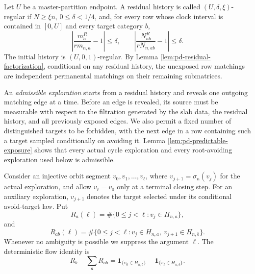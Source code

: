 \documentclass[11pt]{article}
\theoremstyle{remark}
\newcommand{\one}{\mathbf 1}
\begin{document}
Let $U$ be a master-partition endpoint.  A residual history is called
$(U,\delta,\xi)$-regular if $N\ge\xi n$, $0\le\delta<1/4$, and, for every row
whose clock interval is contained in $[0,U]$ and every target category $b$,
\begin{equation}
 \left|\frac{m_a^R}{r m_{n,a}}-1\right|\le\delta,
 \qquad
 \left|\frac{N_{ab}^R}{r N_{n,ab}}-1\right|\le\delta.
 \label{eq:pd-regular-history}
\end{equation}
The initial history is $(U,0,1)$-regular.  By Lemma
\ref{lem:pd-residual-factorization}, conditional on any residual history, the
unexposed row matchings are independent permanental matchings on their
remaining submatrices.

An \emph{admissible exploration} starts from a residual history and reveals one
outgoing matching edge at a time.  Before an edge is revealed, its source must
be measurable with respect to the filtration generated by the slab data, the
residual history, and all previously exposed edges.  We also permit a fixed
number of distinguished targets to be forbidden, with the next edge in a row
containing such a target sampled conditionally on avoiding it.  Lemma
\ref{lem:pd-predictable-exposure} shows that every actual cycle exploration and
every root-avoiding exploration used below is admissible.

Consider an injective orbit segment $v_0,v_1,\ldots,v_\ell$, where
$v_{j+1}=\sigma_n(v_j)$ for the actual exploration, and allow
$v_\ell=v_0$ only at a terminal closing step.  For an auxiliary exploration,
$v_{j+1}$ denotes the target selected under its conditional avoid-target law.
Put
\[
 R_a(\ell)=\#\{0\le j<\ell:v_j\in H_{n,a}\},
\]
and
\[
 R_{ab}(\ell)=\#\{0\le j<\ell:v_j\in H_{n,a},\ v_{j+1}\in H_{n,b}\}.
\]
Whenever no ambiguity is possible we suppress the argument $\ell$.  The
deterministic flow identity is
\begin{equation}
 R_b-\sum_aR_{ab}
 =\one_{\{v_0\in H_{n,b}\}}-
  \one_{\{v_\ell\in H_{n,b}\}}.
 \label{eq:pd-flow}
\end{equation}
\end{document}
